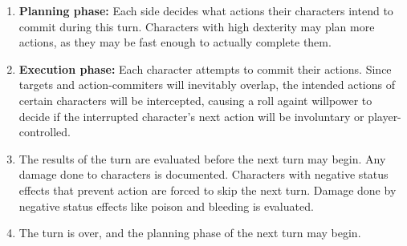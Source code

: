 \documentclass[openany,11pt,a4paper]{book}
\begin{document}
\begin{enumerate}
  \item \textbf{Planning phase:} Each side decides what actions their characters intend to commit during this turn. Characters with high dexterity may plan more actions, as they may be fast enough to actually complete them.
  \item \textbf{Execution phase:} Each character attempts to commit their actions. Since targets and action-commiters will inevitably overlap, the intended actions of certain characters will be intercepted, causing a roll againt willpower to decide if the interrupted character's next action will be involuntary or player-controlled.
  \item The results of the turn are evaluated before the next turn may begin. Any damage done to characters is documented. Characters with negative status effects that prevent action are forced to skip the next turn. Damage done by negative status effects like poison and bleeding is evaluated.
  \item The turn is over, and the planning phase of the next turn may begin.
\end{enumerate}
\end{document}
